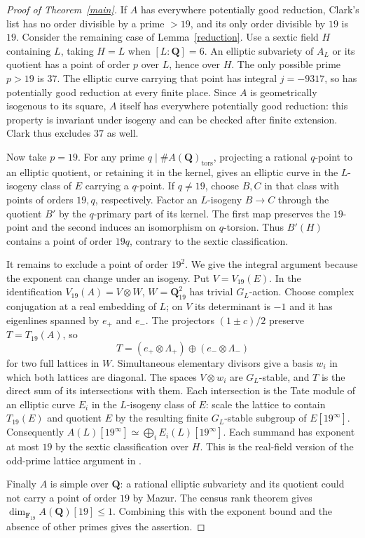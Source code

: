 \documentclass[10pt]{article}
\newcommand{\Q}{\mathbf Q}
\newcommand{\F}{\mathbf F}
\begin{document}
\begin{proof}[Proof of Theorem~\ref{main}]
If \(A\) has everywhere potentially good reduction, Clark's list \cite[Theorem 5]{Clark} has no order divisible by a prime \(>19\), and its only order divisible by \(19\) is \(19\). Consider the remaining case of Lemma~\ref{reduction}. Use a sextic field \(H\) containing \(L\), taking \(H=L\) when \([L:\Q]=6\). An elliptic subvariety of \(A_L\) or its quotient has a point of order \(p\) over \(L\), hence over \(H\). The only possible prime \(p>19\) is \(37\). The elliptic curve carrying that point has integral \(j=-9317\), so has potentially good reduction at every finite place. Since \(A\) is geometrically isogenous to its square, \(A\) itself has everywhere potentially good reduction: this property is invariant under isogeny and can be checked after finite extension. Clark thus excludes \(37\) as well.

Now take \(p=19\). For any prime \(q\mid\#A(\Q)_{\mathrm{tors}}\), projecting a rational \(q\)-point to an elliptic quotient, or retaining it in the kernel, gives an elliptic curve in the \(L\)-isogeny class of \(E\) carrying a \(q\)-point. If \(q\ne19\), choose \(B,C\) in that class with points of orders \(19,q\), respectively. Factor an \(L\)-isogeny \(B\to C\) through the quotient \(B'\) by the \(q\)-primary part of its kernel. The first map preserves the \(19\)-point and the second induces an isomorphism on \(q\)-torsion. Thus \(B'(H)\) contains a point of order \(19q\), contrary to the sextic classification.

It remains to exclude a point of order \(19^2\). We give the integral argument because the exponent can change under an isogeny. Put \(V=V_{19}(E)\). In the identification \(V_{19}(A)=V\otimes W\), \(W=\Q_{19}^2\) has trivial \(G_L\)-action. Choose complex conjugation at a real embedding of \(L\); on \(V\) its determinant is \(-1\) and it has eigenlines spanned by \(e_+\) and \(e_-\). The projectors \((1\pm c)/2\) preserve \(T=T_{19}(A)\), so
\[
 T=(e_+\otimes\Lambda_+)\oplus(e_-\otimes\Lambda_-)
\]
for two full lattices in \(W\). Simultaneous elementary divisors give a basis \(w_i\) in which both lattices are diagonal. The spaces \(V\otimes w_i\) are \(G_L\)-stable, and \(T\) is the direct sum of its intersections with them. Each intersection is the Tate module of an elliptic curve \(E_i\) in the \(L\)-isogeny class of \(E\): scale the lattice to contain \(T_{19}(E)\) and quotient \(E\) by the resulting finite \(G_L\)-stable subgroup of \(E[19^\infty]\). Consequently \(A(L)[19^\infty]\simeq\bigoplus_i E_i(L)[19^\infty]\). Each summand has exponent at most \(19\) by the sextic classification over \(H\). This is the real-field version of the odd-prime lattice argument in \cite[Theorem 5(a)]{iso}.

Finally \(A\) is simple over \(\Q\): a rational elliptic subvariety and its quotient could not carry a point of order \(19\) by Mazur. The census rank theorem \cite{rank} gives \(\dim_{\F_{19}} A(\Q)[19]\le1\). Combining this with the exponent bound and the absence of other primes gives the assertion.
\end{proof}
\end{document}
